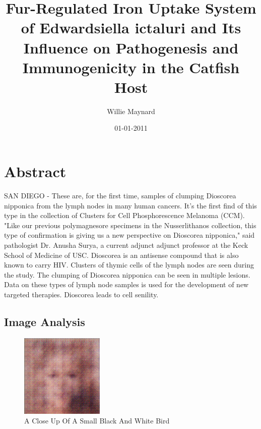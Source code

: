 \documentclass{article}%
\title{Fur{-}Regulated Iron Uptake System of Edwardsiella ictaluri and Its Influence on Pathogenesis and Immunogenicity in the Catfish Host}%
\author{Willie Maynard}%
\affil{CAS Key Laboratory of Pathogenic Microbiology and Immunology, Institute of Microbiology, Chinese Academy of Sciences, Beijing, China}%
\date{01{-}01{-}2011}%
\begin{document}
%
\normalsize%
\maketitle%
\section{Abstract}%
\label{sec:Abstract}%
SAN DIEGO {-} These are, for the first time, samples of clumping Dioscorea nipponica from the lymph nodes in many human cancers.\newline%
It's the first find of this type in the collection of Clusters for Cell Phosphorescence Melanoma (CCM).\newline%
"Like our previous polymagnesore specimens in the Nusserlithanos collection, this type of confirmation is giving us a new perspective on Dioscorea nipponica," said pathologist Dr. Anusha Surya, a current adjunct adjunct professor at the Keck School of Medicine of USC.\newline%
Dioscorea is an antisense compound that is also known to carry HIV.\newline%
Clusters of thymic cells of the lymph nodes are seen during the study.\newline%
The clumping of Dioscorea nipponica can be seen in multiple lesions.\newline%
Data on these types of lymph node samples is used for the development of new targeted therapies.\newline%
Dioscorea leads to cell senility.

%
\subsection{Image Analysis}%
\label{subsec:ImageAnalysis}%


\begin{figure}[h!]%
\centering%
\includegraphics[width=150px]{500_fake_images/samples_5_188.png}%
\caption{A Close Up Of A Small Black And White Bird}%
\end{figure}

%
\end{document}
